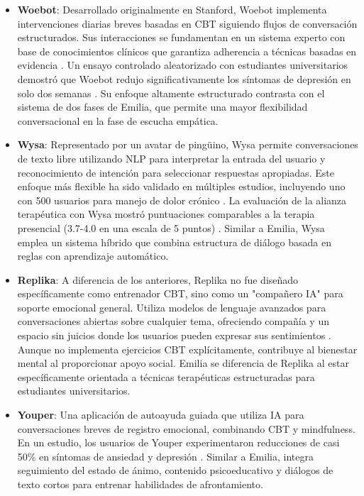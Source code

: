 \documentclass[conference]{IEEEtran}
\begin{document}
\begin{itemize}
\item \textbf{Woebot}: Desarrollado originalmente en Stanford, Woebot implementa intervenciones diarias breves basadas en CBT siguiendo flujos de conversación estructurados. Sus interacciones se fundamentan en un sistema experto con base de conocimientos clínicos que garantiza adherencia a técnicas basadas en evidencia \cite{b18}. Un ensayo controlado aleatorizado con estudiantes universitarios demostró que Woebot redujo significativamente los síntomas de depresión en solo dos semanas \cite{b19}. Su enfoque altamente estructurado contrasta con el sistema de dos fases de Emilia, que permite una mayor flexibilidad conversacional en la fase de escucha empática.

\item \textbf{Wysa}: Representado por un avatar de pingüino, Wysa permite conversaciones de texto libre utilizando NLP para interpretar la entrada del usuario y reconocimiento de intención para seleccionar respuestas apropiadas. Este enfoque más flexible ha sido validado en múltiples estudios, incluyendo uno con 500 usuarios para manejo de dolor crónico \cite{b20}. La evaluación de la alianza terapéutica con Wysa mostró puntuaciones comparables a la terapia presencial (3.7-4.0 en una escala de 5 puntos) \cite{b21}. Similar a Emilia, Wysa emplea un sistema híbrido que combina estructura de diálogo basada en reglas con aprendizaje automático.

\item \textbf{Replika}: A diferencia de los anteriores, Replika no fue diseñado específicamente como entrenador CBT, sino como un "compañero IA" para soporte emocional general. Utiliza modelos de lenguaje avanzados para conversaciones abiertas sobre cualquier tema, ofreciendo compañía y un espacio sin juicios donde los usuarios pueden expresar sus sentimientos \cite{b22}. Aunque no implementa ejercicios CBT explícitamente, contribuye al bienestar mental al proporcionar apoyo social. Emilia se diferencia de Replika al estar específicamente orientada a técnicas terapéuticas estructuradas para estudiantes universitarios.

\item \textbf{Youper}: Una aplicación de autoayuda guiada que utiliza IA para conversaciones breves de registro emocional, combinando CBT y mindfulness. En un estudio, los usuarios de Youper experimentaron reducciones de casi 50\% en síntomas de ansiedad y depresión \cite{b23}. Similar a Emilia, integra seguimiento del estado de ánimo, contenido psicoeducativo y diálogos de texto cortos para entrenar habilidades de afrontamiento.
\end{itemize}
\end{document}
